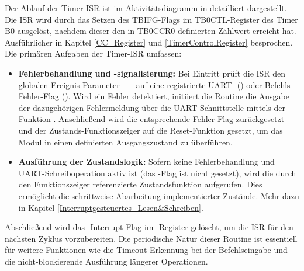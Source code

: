 Der Ablauf der Timer-ISR ist im Aktivit\"atsdiagramm in  detailliert dargestellt. Die ISR wird durch das Setzen des TBIFG-Flags im TB0CTL-Register des Timer B0 ausgel\"ost, nachdem dieser den in TB0CCR0 definierten Z\"ahlwert erreicht hat. Ausf\"uhrlicher in Kapitel \ref{CC_Register} und \ref{TimerControlRegister} besprochen. Die prim\"aren Aufgaben der Timer-ISR umfassen:

\begin{itemize}
	\item \textbf{Fehlerbehandlung und -signalisierung:} Bei Eintritt pr\"uft die ISR den globalen Ereignis-Parameter --  -- auf eine registrierte UART- () oder Befehls-Fehler-Flag (). Wird ein Fehler detektiert, initiiert die Routine die Ausgabe der dazugeh\"origen Fehlermeldung \"uber die UART-Schnittstelle mittels der Funktion . Anschlie{\ss}end wird die entsprechende Fehler-Flag zur\"uckgesetzt und der Zustands-Funktionszeiger  auf die Reset-Funktion  gesetzt, um das Modul in einen definierten Ausgangszustand zu \"uberf\"uhren.

	\item \textbf{Ausf\"uhrung der Zustandslogik:} Sofern keine Fehlerbehandlung und UART-Schreiboperation aktiv ist (das -Flag ist nicht gesetzt), wird die durch den Funktionszeiger  referenzierte Zustandsfunktion aufgerufen. Dies erm\"oglicht die schrittweise Abarbeitung implementierter Zust\"ande. Mehr dazu in Kapitel \ref{Interruptgesteuertes_Lesen&Schreiben}.
\end{itemize}

Abschlie{\ss}end wird das -Interrupt-Flag im -Register gel\"oscht, um die ISR f\"ur den n\"achsten Zyklus vorzubereiten. Die periodische Natur dieser Routine ist essentiell f\"ur weitere Funktionen wie die Timeout-Erkennung bei der Befehlseingabe und die nicht-blockierende Ausf\"uhrung l\"angerer Operationen.

